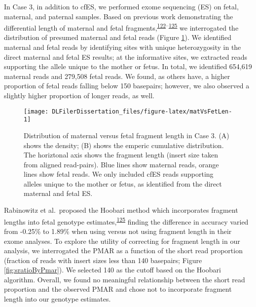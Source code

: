 \documentclass[11pt,letterpaper]{book}
\begin{document}
In Case 3, in addition to cfES, we performed exome sequencing (ES) on fetal, maternal, and paternal samples.
Based on previous work demonstrating the differential length of maternal and fetal fragments,\textsuperscript{\protect\hyperlink{ref-chan:2004aa}{122}--\protect\hyperlink{ref-rabinowitz:2019aa}{125}} we interrogated the distribution of presumed maternal and fetal reads (Figure \ref{fig:matVsFetLen}).
We identified maternal and fetal reads by identifying sites with unique heterozygosity in the direct maternal and fetal ES results; at the informative sites, we extracted reads supporting the allele unique to the mother or fetus.
In total, we identified 654,619 maternal reads and 279,508 fetal reads.
We found, as others have, a higher proportion of fetal reads falling below 150 basepairs; however, we also observed a slightly higher proportion of longer reads, as well.





\begin{figure}

{\centering \texttt{[image: DLFilerDissertation\_files/figure-latex/matVsFetLen-1]} 

}

\caption[Distribution of maternal versus fetal fragment length in Case 3.]{Distribution of maternal versus fetal fragment length in Case 3. (A) shows the density; (B) shows the emperic cumulative distribution. The horiztonal axis shows the fragment length (insert size taken from aligned read-pairs). Blue lines show maternal reads, orange lines show fetal reads. We only included cfES reads supporting alleles unique to the mother or fetus, as identified from the direct maternal and fetal ES.}\label{fig:matVsFetLen}
\end{figure}

Rabinowitz et al.~proposed the Hoobari method which incorporates fragment lengths into fetal genotype estimates,\textsuperscript{\protect\hyperlink{ref-rabinowitz:2019aa}{125}} finding the difference in accuracy varied from -0.25\% to 1.89\% when using versus not using fragment length in their exome analyses.
To explore the utility of correcting for fragment length in our analysis, we interrogated the PMAR as a function of the short read proportion (fraction of reads with insert sizes less than 140 basepairs; Figure \ref{fig:sratioByPmar}).
We selected 140 as the cutoff based on the Hoobari algorithm.
Overall, we found no meaningful relationship between the short read proportion and the observed PMAR and chose not to incorporate fragment length into our genotype estimates.
\end{document}
